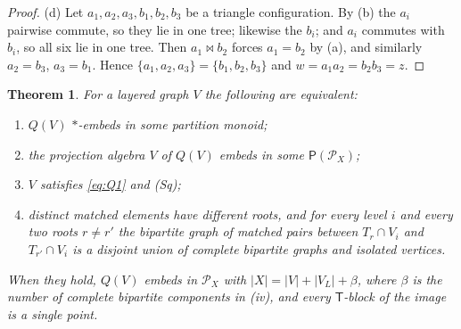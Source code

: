 \documentclass[11pt]{amsart}
\newtheorem{theorem}{Theorem}[section]
\theoremstyle{definition}
\renewcommand{\P}{\mathcal{P}}      %
\newcommand{\PA}{\mathsf{P}}         %
\newcommand{\T}{\mathsf{T}}
\newcommand{\mt}{\bowtie}      %
\newcommand{\Wire}{\textup{(Sq)}}      %
\begin{document}
\begin{proof}
(d) Let $a_1,a_2,a_3,b_1,b_2,b_3$ be a triangle configuration. By (b) the $a_i$ pairwise commute, so they lie in one tree; likewise the $b_i$; and $a_i$ commutes with $b_i$, so all six lie in one tree. Then $a_1\mt b_2$ forces $a_1=b_2$ by (a), and similarly $a_2=b_3$, $a_3=b_1$. Hence $\{a_1,a_2,a_3\}=\{b_1,b_2,b_3\}$ and $w=a_1a_2=b_2b_3=z$.
\end{proof}

\begin{theorem}\label{thm:layered}
For a layered graph $V$ the following are equivalent:
\begin{enumerate}[label=\textup{(\roman*)},nosep]
\item $Q(V)$ $*$-embeds in some partition monoid;
\item the projection algebra $V$ of $Q(V)$ embeds in some $\PA(\P_X)$;
\item $V$ satisfies \eqref{eq:Q1} and \Wire;
\item distinct matched elements have different roots, and for every level $i$ and every two roots $r\ne r'$ the bipartite graph of matched pairs between $T_r\cap V_i$ and $T_{r'}\cap V_i$ is a disjoint union of complete bipartite graphs and isolated vertices.
\end{enumerate}
When they hold, $Q(V)$ embeds in $\P_X$ with $|X|=|V|+|V_L|+\beta$, where $\beta$ is the number of complete bipartite components in \textup{(iv)}, and every $\T$-block of the image is a single point.
\end{theorem}
\end{document}
